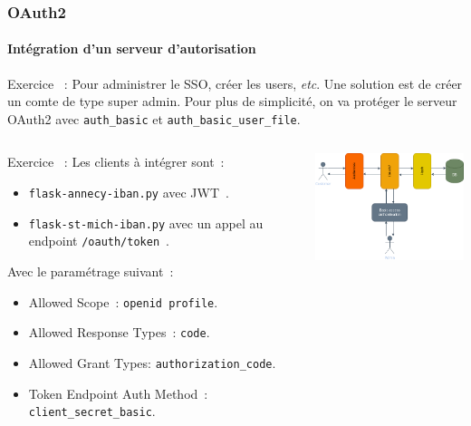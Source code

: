 \documentclass{beamer}
\begin{document}
    \begin{frame}
        \frametitle{OAuth2}
        \framesubtitle{Intégration d'un serveur d'autorisation}
        \transdissolve
        Exercice \execcounterdispinc{}~:
        Pour administrer le SSO, créer les users, \textit{etc}.
        Une solution est de créer un comte de type super admin.
        Pour plus de simplicité, on va protéger le serveur OAuth2 avec \lstinline{auth_basic} et \lstinline{auth_basic_user_file}.
        \begin{columns}
            \begin{column}{0.6\textwidth}
                Exercice \execcounterdispinc{}~:
                Les clients à intégrer sont~:
                \begin{itemize}
                    \item \lstinline{flask-annecy-iban.py} avec JWT~.
                    \item \lstinline{flask-st-mich-iban.py} avec un appel au endpoint \lstinline{/oauth/token}~.
                \end{itemize}
                Avec le paramétrage suivant~:
                \begin{itemize}
                    \item Allowed Scope~: \lstinline{openid profile}.
                    \item Allowed Response Types~: \lstinline{code}.
                    \item Allowed Grant Types: \lstinline{authorization_code}.
                    \item Token Endpoint Auth Method~: \lstinline{client_secret_basic}.
                \end{itemize}
            \end{column}
            \begin{column}{0.4\textwidth}
                \centering
                \includegraphics[width=6cm]{image/OAuth2-integration.drawio}
            \end{column}
        \end{columns}
    \end{frame}
\end{document}
